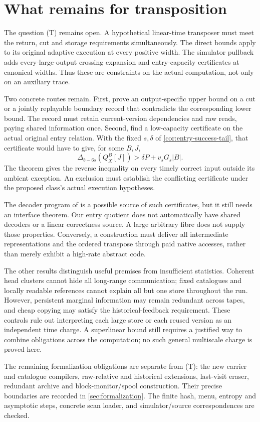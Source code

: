 \section{What remains for transposition}\label{sec:open}

The question (T) remains open. A hypothetical linear-time transposer must
meet the return, cut and storage requirements simultaneously. The direct
bounds apply to its original adaptive execution at every positive width.
The simulator pullback adds every-large-output crossing expansion and
entry-capacity certificates at canonical widths. Thus these are constraints
on the actual computation, not only on an auxiliary trace.

Two concrete routes remain. First, prove an output-specific upper bound
on a cut or a jointly replayable boundary record that contradicts the
corresponding lower bound. The record must retain current-version
dependencies and raw reads, paying shared information once. Second, find a
low-capacity certificate on the actual original entry relation. With the
fixed $s,\delta$ of \cref{cor:entry-success-tail}, that certificate would
have to give, for some $B,J$,
\[
 \Delta_{b-6s}(Q_X^B[J])>\delta P+v_sG_s|B|.
\]
The theorem gives the reverse inequality on every timely correct input outside its
ambient exception. An exclusion must establish the conflicting certificate
under the proposed class's actual execution hypotheses.

The decoder program of \cite[Problem~9.4]{SeventeenthPaper2026} is a
possible source of such certificates, but it still needs an interface
theorem. Our entry quotient does not automatically have shared decoders
or a linear correctness source. A large arbitrary fibre does not supply
those properties. Conversely, a construction must deliver all intermediate
representations and the ordered transpose through paid native accesses,
rather than merely exhibit a high-rate abstract code.

The other results distinguish useful premises from insufficient statistics.
Coherent head clusters cannot hide all long-range communication; fixed
catalogues and locally readable references cannot explain all but one
store throughout the run. However, persistent marginal information may
remain redundant across tapes, and cheap copying may satisfy the
historical-feedback requirement. These controls rule out interpreting
each large store or each reused version as an independent time charge.
A superlinear bound still requires a justified way to combine obligations
across the computation; no such general multiscale charge is proved here.

The remaining formalization obligations are separate from (T): the new
carrier and catalogue compilers, raw-relative and historical extensions,
last-visit eraser, redundant archive and block-monitor/spool construction.
Their precise boundaries are recorded in \cref{sec:formalization}.
The finite hash, menu, entropy and asymptotic steps, concrete scan loader,
and simulator/source correspondences are checked.
